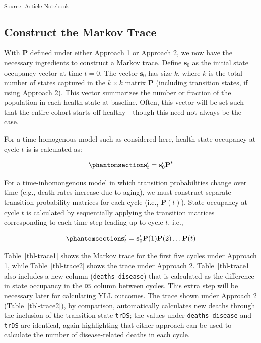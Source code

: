 \documentclass[
]{agujournal2019}
\begin{document}
\textsubscript{Source:
\href{https://graveja0.github.io/dalys/index.qmd.html}{Article
Notebook}}

\subsection{Construct the Markov
Trace}\label{construct-the-markov-trace}

With \(\mathbf{P}\) defined under either Approach 1 or Approach 2, we
now have the necessary ingredients to construct a Markov trace. Define
\(\mathbf{s}_0\) as the initial state occupancy vector at time \(t=0\).
The vector \(\mathbf{s}_0\) has size \(k\), where \(k\) is the total
number of states captured in the \(k \times k\) matrix \(\mathbf{P}\)
(including transition states, if using Approach 2). This vector
summarizes the number or fraction of the population in each health state
at baseline. Often, this vector will be set such that the entire cohort
starts off healthy---though this need not always be the case.

For a time-homogenous model such as considered here, health state
occupancy at cycle \(t\) is is calculated as:

\begin{equation}\phantomsection\label{eq-trace}{
\mathbf{s}'_t=\mathbf{s}'_0 \mathbf{P}^t
}\end{equation}

For a time-inhomongenous model in which transition probabilities change
over time (e.g., death rates increase due to aging), we must construct
separate transition probability matrices for each cycle (i.e.,
\(\mathbf{P}(t)\)). State occupancy at cycle \(t\) is calculated by
sequentially applying the transition matrices corresponding to each time
step leading up to cycle \(t\), i.e.,

\begin{equation}\phantomsection\label{eq-trace-inhomo}{
\mathbf{s}'_t=\mathbf{s}'_0 \mathbf{P}(1)\mathbf{P}(2)\dots\mathbf{P}(t)
}\end{equation}

Table~\ref{tbl-trace1} shows the Markov trace for the first five cycles
under Approach 1, while Table~\ref{tbl-trace2} shows the trace under
Approach 2. Table~\ref{tbl-trace1} also includes a new column
(\texttt{deaths\_disease}) that is calculated as the difference in state
occupancy in the \texttt{DS} column between cycles. This extra step will
be necessary later for calculating YLL outcomes. The trace shown under
Approach 2 (Table~\ref{tbl-trace2}), by comparison, automatically
calculates new deaths through the inclusion of the transition state
\texttt{trDS}; the values under \texttt{deaths\_disease} and
\texttt{trDS} are identical, again highlighting that either approach can
be used to calculate the number of disease-related deaths in each cycle.
\end{document}
